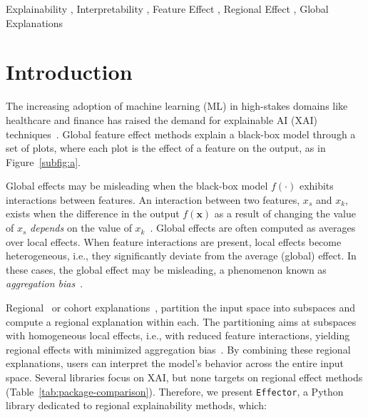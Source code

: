 \documentclass[
twocolumn,
]{ceurart}
\begin{document}
\begin{keywords}
  Explainability \sep
  Interpretability \sep
  Feature Effect \sep
  Regional Effect \sep
  Global Explanations
\end{keywords}

\maketitle

\section{Introduction}
\label{sec:introduction}

The increasing adoption of machine learning (ML) in high-stakes domains like healthcare and finance has raised the demand
for explainable AI (XAI) techniques~\citep{freiesleben_scientific_2022, ribeiro2016should}.
Global feature effect methods explain a black-box model through a set of plots, where each plot is the effect of a feature on the output, as in Figure~\ref{subfig:a}.

Global effects may be misleading when the black-box model $f(\cdot)$ exhibits interactions between features.
An interaction between two features, $x_s$ and $x_k$,
exists when the difference in the output $f(\mathbf{x})$ as a result of changing the value of $x_s$ \textit{depends} on the value of $x_k$~\citep{friedman_predictive_2008}.
Global effects are often computed as averages over local effects.
When feature interactions are present, local effects become heterogeneous, i.e., they significantly deviate from the average (global) effect.
In these cases, the global effect may be misleading, a phenomenon known as \emph{aggregation bias}~\citep{mehrabi_survey_2021, herbinger_repid_2022}.

Regional~\citep{herbinger2023decomposing, herbinger_repid_2022, molnar2023model, britton2019vine, hu2020surrogate, scholbeck2022marginal} or cohort explanations~\citep{sokol2020explainability}, partition the input space into subspaces and compute a regional explanation within each.
The partitioning aims at subspaces with homogeneous local effects, i.e., with reduced feature interactions, yielding regional effects with minimized aggregation bias~\citep{herbinger_repid_2022}. 
By combining these regional explanations, users can interpret the model's behavior across the entire input space.
Several libraries focus on XAI, but
none targets on regional effect methods (Table~\ref{tab:package-comparison}). Therefore, we present \texttt{Effector}, a Python library dedicated to regional explainability methods, which:
\end{document}
